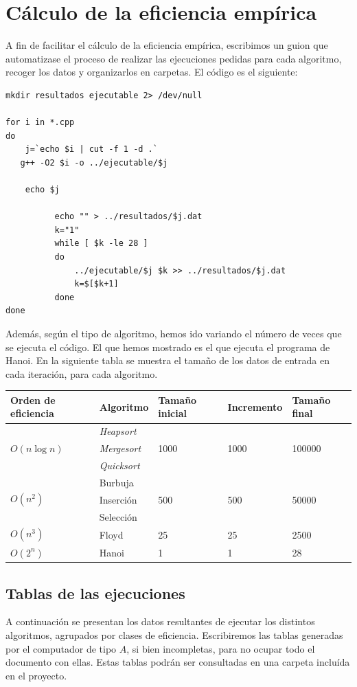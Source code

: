 \documentclass[a4paper, 11pt]{article}
\begin{document}
\section{Cálculo de la eficiencia empírica}
A fin de facilitar el cálculo de la eficiencia empírica, escribimos un guion que automatizase el proceso de realizar las ejecuciones pedidas para cada algoritmo, recoger los datos y organizarlos en carpetas. El código es el siguiente:

\begin{lstlisting}
mkdir resultados ejecutable 2> /dev/null

for i in *.cpp
do
    j=`echo $i | cut -f 1 -d .`
   g++ -O2 $i -o ../ejecutable/$j

    echo $j

	      echo "" > ../resultados/$j.dat
	      k="1"
	      while [ $k -le 28 ]
	      do
	          ../ejecutable/$j $k >> ../resultados/$j.dat
	          k=$[$k+1]
	      done
done

\end{lstlisting}

Además, según el tipo de algoritmo, hemos ido variando el número de veces que se ejecuta el código.
El que hemos mostrado es el que ejecuta el programa de Hanoi. 
En la siguiente tabla se muestra el tamaño de los datos de entrada en cada iteración, para cada algoritmo.

\begin{tabular}{lllll}
	Orden de eficiencia & Algoritmo & Tamaño inicial & Incremento & Tamaño final\\ \midrule
	\multirow{3}{*}{$O(n\log n)$} & \textit{Heapsort} & \multirow{3}{*}{1000} & \multirow{3}{*}{1000} & \multirow{3}{*}{100000} \\
	& \textit{Mergesort} & & &\\
	& \textit{Quicksort} & & &\\ \midrule
	\multirow{3}{*}{$O\left(n^2\right)$} & Burbuja & \multirow{3}{*}{500} & \multirow{3}{*}{500} & \multirow{3}{*}{50000} \\
	& Inserción & & &\\
	& Selección & & &\\ \midrule
	$O\left(n^3\right)$ & Floyd & 25 & 25 & 2500 \\\midrule
	$O\left(2^n\right)$ & Hanoi & 1 & 1 & 28
	
\end{tabular}

\subsection{Tablas de las ejecuciones}
A continuación se presentan los datos resultantes de ejecutar los distintos algoritmos, agrupados por clases de eficiencia. Escribiremos  las tablas generadas por el computador de tipo $A$, si bien incompletas, para no ocupar todo el documento con ellas. Estas tablas podrán ser consultadas en una carpeta incluída en el proyecto.
\end{document}
